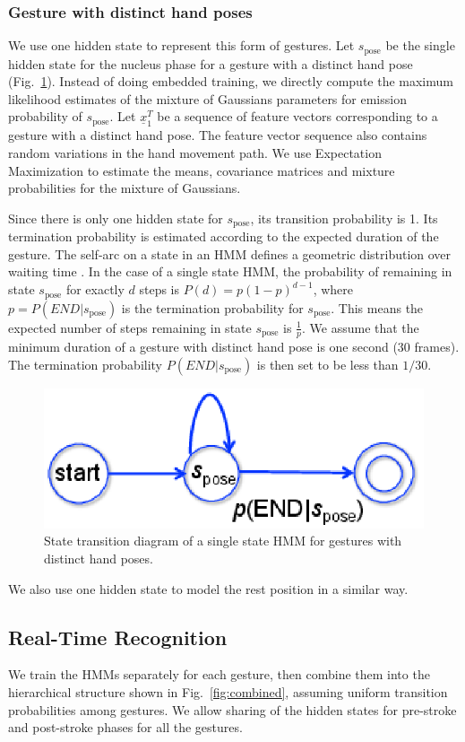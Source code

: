 \documentclass[conference]{IEEEtran}
\begin{document}
\subsubsection{Gesture with distinct hand poses}
We use one hidden state to represent this form of gestures. Let
$s_{\text{pose}}$ be the single hidden state for the nucleus phase for a gesture
with a distinct hand pose (Fig.~\ref{fig:single}). Instead of doing embedded
training, we directly compute the maximum likelihood estimates of the mixture of
Gaussians parameters for emission probability of  $s_{\text{pose}}$. Let
$\underline{x}_1^T$ be a sequence of feature vectors corresponding to a gesture with a distinct hand pose. The feature vector sequence also contains random variations in the hand movement
path. 
We use Expectation Maximization to estimate the means, covariance matrices and
mixture probabilities for the mixture of Gaussians.

Since there is only one hidden state for $s_{\text{pose}}$, its transition
probability is 1. Its termination probability is estimated according to the
expected duration of the gesture. The self-arc on a state in an HMM defines a 
geometric distribution over waiting time \cite{murphy02}. In the case of a
single state HMM, the probability of remaining in state $s_{\text{pose}}$ for
exactly $d$ steps is $P(d) = p(1-p)^{d - 1}$, where $p = P(END|s_\text{pose})$
is the termination probability for $s_{\text{pose}}$. This means the expected
number of steps remaining in state $s_{\text{pose}}$ is $\frac{1}{p}$. We assume
that the minimum duration of a gesture with distinct hand pose is one second
(30 frames). The termination probability $P(END|s_\text{pose})$ is then set to
be less than $1/30$.

\begin{figure}[t]
\centering
\includegraphics[width=0.5\columnwidth]{fig/single_state.ps}
\caption{State transition diagram of a single state HMM for gestures with
distinct hand poses. }
\label{fig:single}
\end{figure}

We also use one hidden state to model the rest position in a similar way.


\subsection{Real-Time Recognition}
We train the HMMs separately for each gesture, then combine them into the
hierarchical structure shown in Fig.~\ref{fig:combined}, assuming uniform
transition probabilities among gestures.
We allow sharing of the hidden states for pre-stroke and post-stroke phases for all the gestures. 
\end{document}

